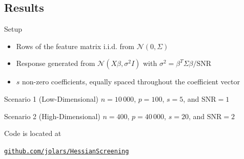 \documentclass[10pt,ignorenonframetext]{beamer}
\begin{document}

\subsection{Results}

\begin{frame}{Setup}
  \begin{itemize}
    \item Rows of the feature matrix i.i.d. from
          \(\mathcal{N}(0,\Sigma)\)
    \item Response generated from \(\mathcal{N}(X\beta,\sigma^2 I)\)
          with
          \(\sigma^2 = \beta^T\Sigma \beta/\text{SNR}\)
    \item \(s\) non-zero coefficients, equally spaced throughout the
          coefficient vector
  \end{itemize}

  \begin{block}{Scenario 1 (Low-Dimensional)}
    \(n = 10\,000\), \(p = 100\), \(s = 5\), and \(\text{SNR} = 1\)
  \end{block}

  \begin{block}{Scenario 2 (High-Dimensional)}
    \(n = 400\), \(p = 40\,000\), \(s = 20\), and \(\text{SNR} = 2\)
  \end{block}

  \medskip

  Code is located at

  \href{https://github.com/jolars/HessianScreening}{\nolinkurl{github.com/jolars/HessianScreening}}
\end{frame}
\end{document}
